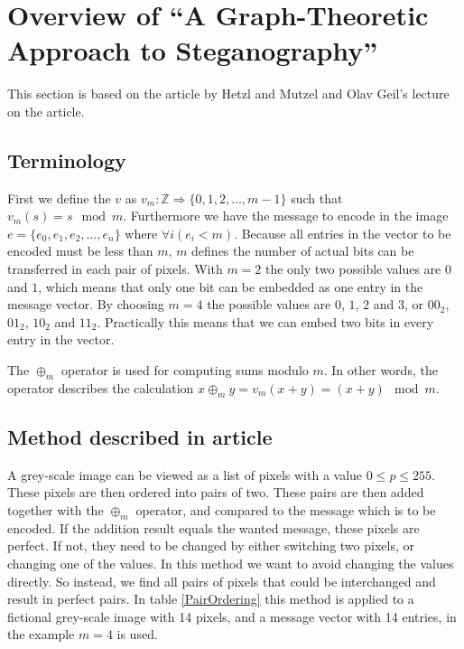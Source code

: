 \clearpage
\section{Overview of ``A Graph-Theoretic Approach to Steganography''}
\label{sec:graphtheory}
{\footnotesize This section is based on the article by Hetzl and Mutzel\citep{hetzl_2005} and Olav Geil's lecture on the article.}

\subsection*{Terminology}
First we define the $v$ as $ v_m: \mathds{Z} \Rightarrow \{0,1,2,\ldots,m-1\} $ such that $ v_m(s) = s \mod m $. Furthermore we have the message to encode in the image $e = \{ e_0, e_1, e_2, \ldots, e_n \}$ where $\forall i\left( e_i < m \right)$. Because all entries in the vector to be encoded must be less than $m$, $m$ defines the number of actual bits can be transferred in each pair of pixels. With $m = 2$ the only two possible values are $0$ and $1$, which means that only one bit can be embedded as one entry in the message vector. By choosing $m = 4$ the possible values are $0$, $1$, $2$ and $3$, or $00_2$, $01_2$, $10_2$ and $11_2$. Practically this means that we can embed two bits in every entry in the vector.

The $\oplus_m$ operator is used for computing sums modulo $m$. In other words, the operator describes the calculation $x \oplus_m y = v_m(x + y) = (x + y) \mod m$.  

\subsection*{Method described in article}

A grey-scale image can be viewed as a list of pixels with a value $0 \leq p \leq 255$. These pixels are then ordered into pairs of two. These pairs are then added together with the $\oplus_m$ operator, and compared to the message which is to be encoded. If the addition result equals the wanted message, these pixels are perfect. If not, they need to be changed by either switching two pixels, or changing one of the values. In this method we want to avoid changing the values directly. So instead, we find all pairs of pixels that could be interchanged and result in perfect pairs. In table \ref{PairOrdering} this method is applied to a fictional grey-scale image with 14 pixels, and a message vector with 14 entries, in the example $m=4$ is used. 

